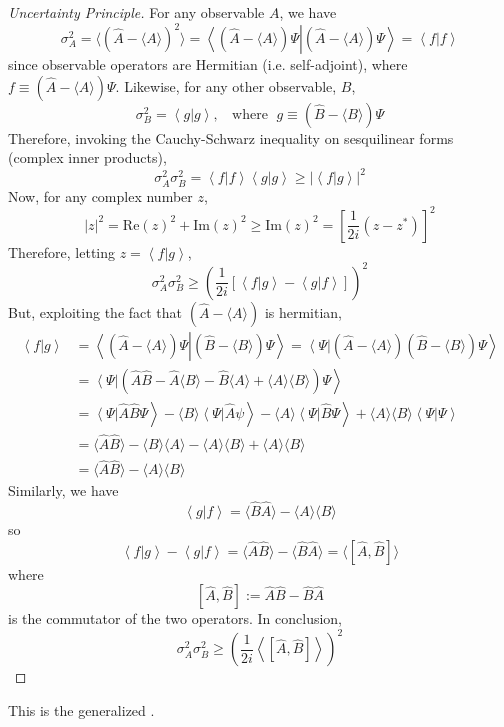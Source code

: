 \documentclass[12pt, a4paper, oneside, openright, titlepage]{book}
\newcommand{\braket}[2]{\left\langle#1\right\vert\left.#2\right\rangle}
\begin{document}
\begin{proof}[Uncertainty Principle]
    For any observable $A$, we have $$\sigma_A^2 = \langle (\hat{A}-\langle A\rangle)^2\rangle = \braket{\left(\hat{A}-\langle A\rangle\right)\Psi}{\left(\hat{A}-\langle A\rangle\right)\Psi} = \braket{f}{f}$$ since observable operators are Hermitian (i.e. self-adjoint), where $f \equiv \left(\hat{A} - \langle A\rangle\right)\Psi$. Likewise, for any other observable, $B$, $$\sigma_B^2 = \braket{g}{g},\;\;\text{ where }\;g \equiv \left(\hat{B}-\langle B\rangle\right)\Psi$$
    Therefore, invoking the Cauchy-Schwarz inequality on sesquilinear forms (complex inner products), $$\sigma_A^2\sigma_B^2 = \braket{f}{f}\braket{g}{g} \geq |\braket{f}{g}|^2$$ Now, for any complex number $z$, $$|z|^2 = \text{Re}(z)^2 + \text{Im}(z)^2 \geq \text{Im}(z)^2 = \left[\frac{1}{2i}(z-z^*)\right]^2$$
    Therefore, letting $z = \braket{f}{g}$, $$\sigma_A^2\sigma_B^2 \geq \left(\frac{1}{2i}\left[\braket{f}{g} - \braket{g}{f}\right]\right)^2$$
    But, exploiting the fact that $(\hat{A}-\langle A\rangle)$ is hermitian, \begin{align*}
        \braket{f}{g} &= \braket{\left(\hat{A}-\langle A\rangle\right)\Psi}{\left(\hat{B}-\langle B\rangle\right)\Psi} = \braket{\Psi}{\left(\hat{A}-\langle A\rangle\right)\left(\hat{B}-\langle B\rangle\right)\Psi} \\
        &= \braket{\Psi}{\left(\hat{A}\hat{B} - \hat{A}\langle B\rangle - \hat{B}\langle A\rangle + \langle A\rangle\langle B\rangle\right)\Psi} \\
        &= \braket{\Psi}{\hat{A}\hat{B}\Psi} - \langle B\rangle\braket{\Psi}{\hat{A}\psi} - \langle A\rangle \braket{\Psi}{\hat{B}\Psi} + \langle A\rangle \langle B\rangle \braket{\Psi}{\Psi} \\
        &= \langle \hat{A}\hat{B}\rangle - \langle B\rangle\langle A\rangle - \langle A\rangle \langle B\rangle + \langle A\rangle \langle B \rangle \\
        &= \langle \hat{A}\hat{B}\rangle - \langle A\rangle \langle B\rangle 
    \end{align*}
    Similarly, we have $$\braket{g}{f} = \langle \hat{B}\hat{A}\rangle - \langle A \rangle \langle B\rangle $$
    so $$\braket{f}{g} - \braket{g}{f} = \langle \hat{A}\hat{B}\rangle - \langle \hat{B}\hat{A}\rangle = \langle [\hat{A},\hat{B}]\rangle$$ where $$[\hat{A},\hat{B}] := \hat{A}\hat{B} - \hat{B}\hat{A}$$ is the commutator of the two operators. In conclusion, \begin{equation}
        \boxed{\sigma_A^2\sigma_B^2 \geq \left(\frac{1}{2i}\left\langle\left[\hat{A},\hat{B}\right]\right\rangle\right)^2}
    \end{equation}
\end{proof}
This is the generalized .
\end{document}
